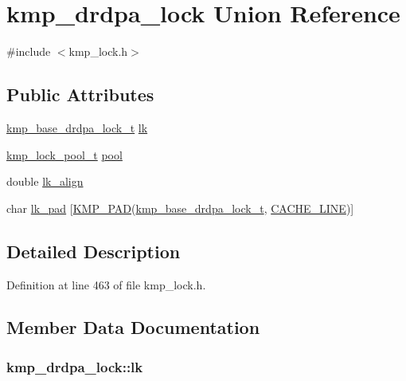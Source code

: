 \hypertarget{unionkmp__drdpa__lock}{\section{kmp\-\_\-drdpa\-\_\-lock Union Reference}
\label{unionkmp__drdpa__lock}
}


{\ttfamily \#include $<$kmp\-\_\-lock.\-h$>$}

\subsection*{Public Attributes}
\begin{DoxyCompactItemize}
\item 
\hyperlink{kmp__lock_8h_a9c05a2302a08b14f8d317b0ed63f3c48}{kmp\-\_\-base\-\_\-drdpa\-\_\-lock\-\_\-t} \hyperlink{unionkmp__drdpa__lock_a86f409a757a405036148f10c7e40d92e}{lk}
\item 
\hyperlink{kmp__lock_8h_a467f5477f4f5397ebd24a94c85922744}{kmp\-\_\-lock\-\_\-pool\-\_\-t} \hyperlink{unionkmp__drdpa__lock_aa1495910d6f872d35d4b7dd3dcbd5c8b}{pool}
\item 
double \hyperlink{unionkmp__drdpa__lock_aa8f648eeb23488e65584493fc61d3e40}{lk\-\_\-align}
\item 
char \hyperlink{unionkmp__drdpa__lock_a21b5a652cc362cd7fb336ca7055fe289}{lk\-\_\-pad} \mbox{[}\hyperlink{kmp__lock_8h_a7e782410115489f45ab1686c39a2bb89}{K\-M\-P\-\_\-\-P\-A\-D}(\hyperlink{kmp__lock_8h_a9c05a2302a08b14f8d317b0ed63f3c48}{kmp\-\_\-base\-\_\-drdpa\-\_\-lock\-\_\-t}, \hyperlink{kmp__os_8h_a86194c659a2d795e5f5949d293ae4661}{C\-A\-C\-H\-E\-\_\-\-L\-I\-N\-E})\mbox{]}
\end{DoxyCompactItemize}


\subsection{Detailed Description}


Definition at line 463 of file kmp\-\_\-lock.\-h.



\subsection{Member Data Documentation}
\hypertarget{unionkmp__drdpa__lock_a86f409a757a405036148f10c7e40d92e}{
\subsubsection[{lk}]{ kmp\-\_\-drdpa\-\_\-lock\-::lk}}\label{unionkmp__drdpa__lock_a86f409a757a405036148f10c7e40d92e}


